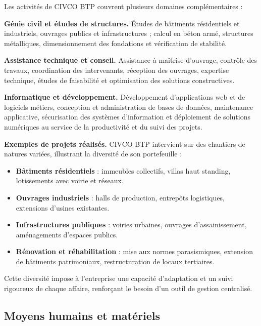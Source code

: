 Les activités de CIVCO BTP couvrent plusieurs domaines complémentaires :

\medskip

\textbf{Génie civil et études de structures.} Études de bâtiments résidentiels et
industriels, ouvrages publics et infrastructures ; calcul en béton armé, structures
métalliques, dimensionnement des fondations et vérification de stabilité.

\medskip

\textbf{Assistance technique et conseil.} Assistance à maîtrise d'ouvrage, contrôle des
travaux, coordination des intervenants, réception des ouvrages, expertise technique,
études de faisabilité et optimisation des solutions constructives.

\medskip

\textbf{Informatique et développement.} Développement d'applications web et de logiciels
métiers, conception et administration de bases de données, maintenance applicative,
sécurisation des systèmes d'information et déploiement de solutions numériques au service
de la productivité et du suivi des projets.

\medskip

\textbf{Exemples de projets réalisés.} CIVCO BTP intervient sur des chantiers de natures
variées, illustrant la diversité de son portefeuille :

\begin{itemize}
  \item \textbf{Bâtiments résidentiels} : immeubles collectifs, villas haut standing,
  lotissements avec voirie et réseaux.
  \item \textbf{Ouvrages industriels} : halls de production, entrepôts logistiques,
  extensions d'usines existantes.
  \item \textbf{Infrastructures publiques} : voiries urbaines, ouvrages d'assainissement,
  aménagements d'espaces publics.
  \item \textbf{Rénovation et réhabilitation} : mise aux normes parasismiques, extension
  de bâtiments patrimoniaux, restructuration de locaux tertiaires.
\end{itemize}

Cette diversité impose à l'entreprise une capacité d'adaptation et un suivi rigoureux
de chaque affaire, renforçant le besoin d'un outil de gestion centralisé.

\subsection{Moyens humains et matériels}


